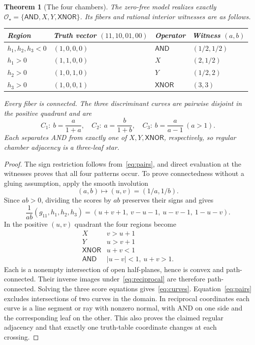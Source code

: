 \documentclass[11pt]{article}
\newtheorem{theorem}{Theorem}[section]
\theoremstyle{definition}
\theoremstyle{remark}
\newcommand{\AND}{\mathsf{AND}}
\newcommand{\XNOR}{\mathsf{XNOR}}
\newcommand{\Oo}{\mathcal O}
\begin{document}
\begin{theorem}[The four chambers]\label{thm:four}
The zero-free model realizes exactly $\Oo_\star=\{\AND,X,Y,\XNOR\}$. Its fibers and rational interior witnesses are as follows.
\begin{center}
\renewcommand{\arraystretch}{1.15}
\begin{tabular}{@{}llll@{}}
\toprule
Region & Truth vector $(11,10,01,00)$ & Operator & Witness $(a,b)$\\
\midrule
$h_1,h_2,h_3<0$ & $(1,0,0,0)$ & $\AND$ & $(1/2,1/2)$\\
$h_1>0$ & $(1,1,0,0)$ & $X$ & $(2,1/2)$\\
$h_2>0$ & $(1,0,1,0)$ & $Y$ & $(1/2,2)$\\
$h_3>0$ & $(1,0,0,1)$ & $\XNOR$ & $(3,3)$\\
\bottomrule
\end{tabular}
\end{center}
Every fiber is connected. The three discriminant curves are pairwise disjoint in the positive quadrant and are
\begin{equation}\label{eq:curves}
 C_1:\ b=\frac{a}{1+a},\quad
 C_2:\ a=\frac{b}{1+b},\quad
 C_3:\ b=\frac{a}{a-1}\ (a>1).
\end{equation}
Each separates AND from exactly one of $X,Y,\XNOR$, respectively, so regular chamber adjacency is a three-leaf star.
\end{theorem}
\begin{proof}
The sign restriction follows from~\eqref{eq:pairs}, and direct evaluation at the witnesses proves that all four patterns occur. To prove connectedness without a gluing assumption, apply the smooth involution
\begin{equation}\label{eq:reciprocal}
 (a,b)\longmapsto(u,v)=(1/a,1/b).
\end{equation}
Since $ab>0$, dividing the scores by $ab$ preserves their signs and gives
\begin{equation}\label{eq:normal}
 \frac{1}{ab}(g_{11},h_1,h_2,h_3)
 =(u+v+1,\ v-u-1,\ u-v-1,\ 1-u-v).
\end{equation}
In the positive $(u,v)$ quadrant the four regions become
\[
 \begin{array}{c|l}
 X&v>u+1\\
 Y&u>v+1\\
 \XNOR&u+v<1\\
 \AND&|u-v|<1,\ u+v>1.
 \end{array}
\]
Each is a nonempty intersection of open half-planes, hence is convex and path-connected. Their inverse images under~\eqref{eq:reciprocal} are therefore path-connected. Solving the three score equations gives~\eqref{eq:curves}. Equation~\eqref{eq:pairs} excludes intersections of two curves in the domain. In reciprocal coordinates each curve is a line segment or ray with nonzero normal, with AND on one side and the corresponding leaf on the other. This also proves the claimed regular adjacency and that exactly one truth-table coordinate changes at each crossing.
\end{proof}
\end{document}
